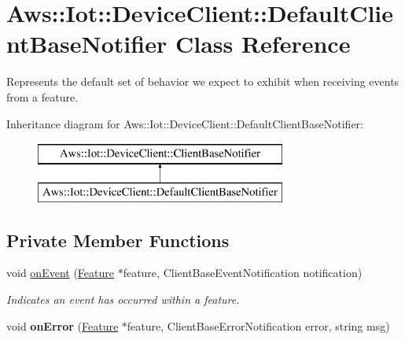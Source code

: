 \hypertarget{class_aws_1_1_iot_1_1_device_client_1_1_default_client_base_notifier}{}\section{Aws\+:\+:Iot\+:\+:Device\+Client\+:\+:Default\+Client\+Base\+Notifier Class Reference}
\label{class_aws_1_1_iot_1_1_device_client_1_1_default_client_base_notifier}


Represents the default set of behavior we expect to exhibit when receiving events from a feature.  


Inheritance diagram for Aws\+:\+:Iot\+:\+:Device\+Client\+:\+:Default\+Client\+Base\+Notifier\+:\begin{figure}[H]
\begin{center}
\leavevmode
\includegraphics[height=2.000000cm]{class_aws_1_1_iot_1_1_device_client_1_1_default_client_base_notifier}
\end{center}
\end{figure}
\subsection*{Private Member Functions}
\begin{DoxyCompactItemize}
\item 
void \hyperlink{class_aws_1_1_iot_1_1_device_client_1_1_default_client_base_notifier_a78ef5a78282bedbfce408e34ebb6a542}{on\+Event} (\hyperlink{class_aws_1_1_iot_1_1_device_client_1_1_feature}{Feature} $\ast$feature, Client\+Base\+Event\+Notification notification)
\begin{DoxyCompactList}\small\item\em Indicates an event has occurred within a feature. \end{DoxyCompactList}\item 
\mbox{\label{class_aws_1_1_iot_1_1_device_client_1_1_default_client_base_notifier_aaff465fc5084f8fe6de4c7362a8e49fb}} 
void {\bfseries on\+Error} (\hyperlink{class_aws_1_1_iot_1_1_device_client_1_1_feature}{Feature} $\ast$feature, Client\+Base\+Error\+Notification error, string msg)
\end{DoxyCompactItemize}
